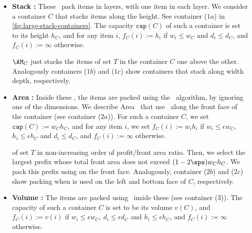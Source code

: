\begin{itemize}
    
    
    \item \textbf{Stack \boxes:} These \boxes\ pack items in layers, with one item in each layer. We consider a container $C$ that stacks items along the height.  See container ($1a$) in \cref{fig:large-stack-containers}. The capacity $\mathtt{cap}(C)$ of such a container is set to its height $h_C$, and for any item $i$, $f_C(i):=h_i$ if $w_i \le w_C$ and $d_i \le d_C$, and $f_C(i):=\infty$ otherwise.

    $\AM_C$ just stacks the items of set $T$ in the container $C$ one above the other. Analogously containers ($1b$) and ($1c$) show containers that stack along width  depth, respectively.
    
    \item \textbf{Area \boxes:} Inside these \boxes, the items are packed using the \NFDH~algorithm, by ignoring one of the dimensions. We describe Area \boxes\ that use \NFDH~along the front face of the container (see container ($2a$)). For such a container $C$, we set $\mathtt{cap}(C):= w_Ch_C$, and for any item $i$, we set $f_C(i):= w_i h_i$ if $w_i \le \epsilon w_C$, $h_i \le \epsilon h_C$ and $d_i \le d_C$, and $f_C(i):= \infty$ otherwise. 

      of set $T$ in non-increasing order of profit/front area ratio.
    Then, we select the largest prefix whose total front area does not exceed $(1-2\eps)w_Ch_C$. We pack this prefix using \NFDH on the front face.
    Analogously, container ($2b$) and ($2c$) show packing when \NFDH is used on the left and bottom face of $C$, respectively.
    
    
    \item \textbf{Volume \boxes:} The items are packed using \tNFDH~inside these \boxes (see container (3)). The capacity of such a container $C$ is set to be its volume $v(C)$, and $f_C(i):= v(i)$ if $w_i \le \epsilon w_C$, $d_i \le \epsilon d_C$ and $h_i \le \epsilon h_C$, and $f_C(i) := \infty$ otherwise.


\end{itemize}
